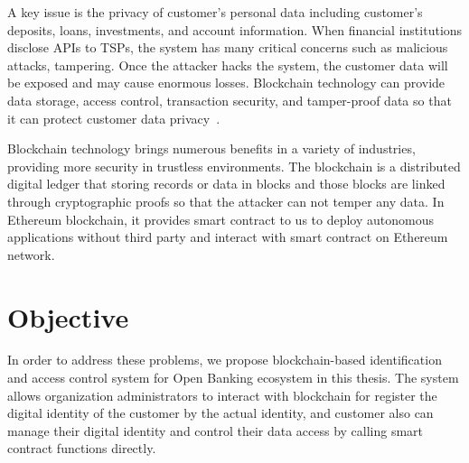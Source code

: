 A key issue is the privacy of customer's personal data including customer's deposits, loans, investments, and account information. When financial institutions disclose APIs to TSPs, the system has many critical concerns such as malicious attacks, tampering. Once the attacker hacks the system, the customer data will be exposed and may cause enormous losses. Blockchain technology can provide data storage, access control, transaction security, and tamper-proof data so that it can protect customer data privacy~\cite{wang2020blockchain}.\par
Blockchain technology brings numerous benefits in a variety of industries, providing more security in trustless environments. The blockchain is a distributed digital ledger that storing records or data in blocks and those blocks are linked through cryptographic proofs so that the attacker can not temper any data. In Ethereum blockchain, it provides smart contract to us to deploy autonomous applications without third party and interact with smart contract on Ethereum network.\par

\section{Objective}

In order to address these problems, we propose blockchain-based identification and access control system for Open Banking ecosystem in this thesis. The system allows organization administrators to interact with blockchain for register the digital identity of the customer by the actual identity, and customer also can manage their digital identity and control their data access by calling smart contract functions directly. \par